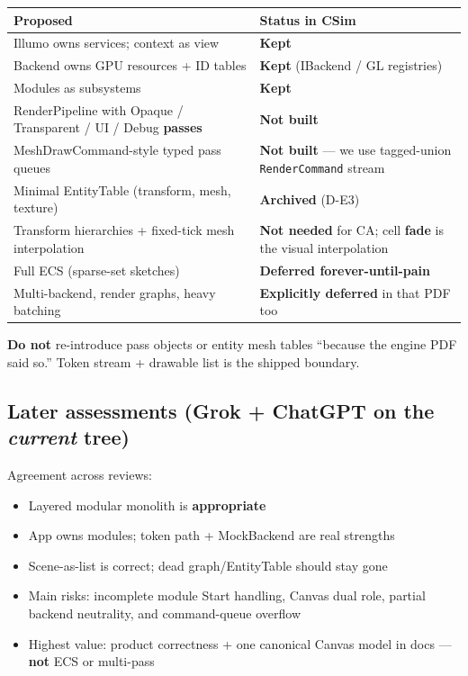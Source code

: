 \documentclass[10pt,a4paper]{article}
\begin{document}
\begin{table}[h!]
\centering
\small
\begin{tabularx}{\textwidth}{l X}
\toprule
\textbf{Proposed} & \textbf{Status in CSim} \\
\midrule
Illumo owns services; context as view & \textbf{Kept} \\
Backend owns GPU resources + ID tables & \textbf{Kept} (IBackend / GL registries) \\
Modules as subsystems & \textbf{Kept} \\
RenderPipeline with Opaque / Transparent / UI / Debug \textbf{passes} & \textbf{Not built} \\
MeshDrawCommand-style typed pass queues & \textbf{Not built} --- we use tagged-union \texttt{RenderCommand} stream \\
Minimal EntityTable (transform, mesh, texture) & \textbf{Archived} (D-E3) \\
Transform hierarchies + fixed-tick mesh interpolation & \textbf{Not needed} for CA; cell \textbf{fade} is the visual interpolation \\
Full ECS (sparse-set sketches) & \textbf{Deferred forever-until-pain} \\
Multi-backend, render graphs, heavy batching & \textbf{Explicitly deferred} in that PDF too \\
\bottomrule
\end{tabularx}
\end{table}

\noindent \textbf{Do not} re-introduce pass objects or entity mesh tables ``because the engine PDF said so.'' Token stream + drawable list is the shipped boundary.

\subsection{Later assessments (Grok + ChatGPT on the \textit{current} tree)}
Agreement across reviews:
\begin{itemize}
    \item Layered modular monolith is \textbf{appropriate}
    \item App owns modules; token path + MockBackend are real strengths
    \item Scene-as-list is correct; dead graph/EntityTable should stay gone
    \item Main risks: incomplete module Start handling, Canvas dual role, partial backend neutrality, and command-queue overflow
    \item Highest value: product correctness + one canonical Canvas model in docs --- \textbf{not} ECS or multi-pass
\end{itemize}
\end{document}

